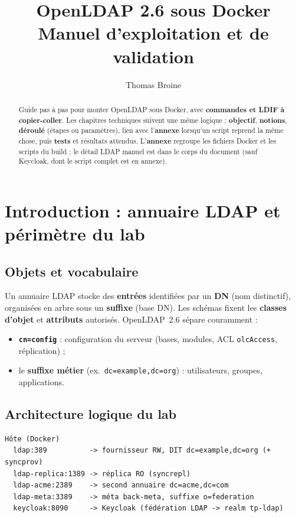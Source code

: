 \documentclass[11pt,a4paper]{report}
\title{OpenLDAP 2.6 sous Docker\\Manuel d'exploitation et de validation}
\author{Thomas Broine}
\date{}
\begin{document}
\maketitle

\begin{abstract}
Guide pas à pas pour monter OpenLDAP sous Docker, avec \textbf{commandes et LDIF à copier-coller}. Les chapitres techniques suivent une même logique : \textbf{objectif}, \textbf{notions}, \textbf{déroulé} (étapes ou paramètres), lien avec l'\textbf{annexe} lorsqu'un script reprend la même chose, puis \textbf{tests} et résultats attendus. L'\textbf{annexe} regroupe les fichiers Docker et les scripts du build ; le détail LDAP manuel est dans le corps du document (sauf Keycloak, dont le script complet est en annexe).
\end{abstract}

\tableofcontents

\chapter{Introduction : annuaire LDAP et périmètre du lab}

\section{Objets et vocabulaire}

Un annuaire LDAP stocke des \textbf{entrées} identifiées par un \textbf{DN} (nom distinctif), organisées en arbre sous un \textbf{suffixe} (base DN). Les schémas fixent les \textbf{classes d'objet} et \textbf{attributs} autorisés. OpenLDAP~2.6 sépare couramment :
\begin{itemize}[leftmargin=*]
  \item \textbf{\texttt{cn=config}} : configuration du serveur (bases, modules, ACL \texttt{olcAccess}, réplication) ;
  \item le \textbf{suffixe métier} (ex.\ \texttt{dc=example,dc=org}) : utilisateurs, groupes, applications.
\end{itemize}

\section{Architecture logique du lab}

\begin{verbatim}
Hôte (Docker)
  ldap:389          -> fournisseur RW, DIT dc=example,dc=org (+ syncprov)
  ldap-replica:1389 -> réplica RO (syncrepl)
  ldap-acme:2389    -> second annuaire dc=acme,dc=com
  ldap-meta:3389    -> méta back-meta, suffixe o=federation
  keycloak:8090     -> Keycloak (fédération LDAP -> realm tp-ldap)
\end{verbatim}
\end{document}
